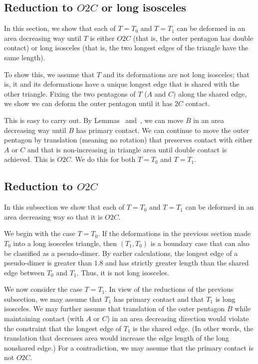 \subsection{Reduction to $O2C$ or long isosceles}

In this section, we show that each of $T=T_0$ and $T=T_1$ can be
deformed in an area decreasing way until $T$ is either $O2C$ (that is,
the outer pentagon has double contact) or long isosceles (that is, the
two longest edges of the triangle have the same length).

To show this, we assume that $T$ and its deformations are not long
isosceles; that is, it and its deformations have a unique longest edge
that is shared with the other triangle.  Fixing the two pentagons of
$T$ ($A$ and $C$) along the shared edge, we show we can deform the
outer pentagon until it has $2C$ contact.

This is easy to carry out.  By Lemmas~
and~, we can move $B$ in an area decreasing way
until $B$ has primary contact.  We can continue to move the outer
pentagon by translation (meaning no rotation) that preserves contact
with either $A$ or $C$ and that is non-increasing in triangle area
until double contact is achieved.  This is $O2C$.  We do this for both
$T=T_0$ and $T=T_1$.

\subsection{Reduction to $O2C$}

In this subsection we show that each of $T=T_0$ and $T=T_1$ can be
deformed in an area decreasing way so that it is $O2C$.

We begin with the case $T=T_0$.  If the deformations in the previous
section made $T_0$ into a long isosceles triangle, then $(T_1,T_0)$ is
a boundary case that can also be classified as a pseudo-dimer.  By
earlier calculations, the longest edge of a pseudo-dimer is greater
than $1.8$ and has strictly greater length than the shared edge
between $T_0$ and $T_1$.  Thus, it is not long isosceles.

We now consider the case $T=T_1$.  In view of the reductions of the
previous subsection, we may assume that $T_1$ has primary contact and
that $T_1$ is long isosceles.  We may further assume that translation
of the outer pentagon $B$ while maintaining contact (with  $A$ or $C$)
in an area decreasing direction would violate the constraint that the
longest edge of $T_1$ is the shared edge.  (In other words, the
translation that decreases area would increase the edge length of the
long nonshared edge.)  For a contradiction, we may assume that the
primary contact is not $O2C$.

